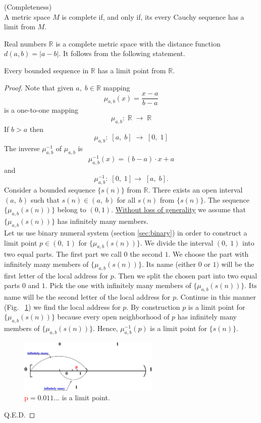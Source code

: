 \documentclass[color=black,11pt]{elegantpaper}
\begin{document}
\begin{definition} (Completeness)\\
A metric space $M$ is complete if, and only if, its every Cauchy sequence has a limit from $M.$
\end{definition}
Real numbers $\mathbb{R}$ is a complete metric space with the distance function $d(a,b)=|a-b|.$  It follows from the following statement.
\begin{theorem}
\label{th:completeness}
Every bounded sequence in  $\mathbb{R}$  has a limit point from $\mathbb{R}.$

\end{theorem} 
\begin{proof}
Note that given $a,\;b \in \mathbb{R}$ mapping
$$
\mu_{a,b}(x) = \frac{x-a}{b-a}
$$
is a one-to-one mapping 
$$
\mu_{a,b}:\;\mathbb{R} \;\to \;\mathbb{R}
$$
If $b>a$ then
$$
\mu_{a,b}:\;[a,\;b] \; \to \; [0,\;1]
$$
The inverse $\mu_{a,b}^{-1}$ of $\mu_{a,b}$ is
$$
\mu_{a,b}^{-1}(x) = (b-a) \cdot x+a 
$$
and
$$
\mu_{a,b}^{-1} :\;  [0,\;1] \to \;[a,\;b].
$$ 
Consider a bounded sequence $\{s(n)\}$ from $\mathbb{R}.$ There exists an open interval $(a,\;b)$ such that $ s(n) \in (a,\;b)$ for all $s(n)$ from $\{s(n)\}.$ The sequence $\{\mu_{a,b} (s(n)) \}$ belong to $(0,1).$ \href{https://en.wikipedia.org/wiki/Without_loss_of_generality}{Without loss of generality} we assume that $\{\mu_{a,b} (s(n)) \}$ has infinitely many members.\\
Let us use binary numeral system (section \ref{sec:binary}) in order to construct a limit point $p\in (0,\;1)$ for $\{\mu_{a,b} (s(n)) \}.$ We divide the interval $(0,\;1)$ into two equal parts. The first part we call $0$ the second $1.$ We choose the part with infinitely many members of  $\{\mu_{a,b} (s(n)) \}.$ Its name (either $0$ or $1)$ will be the first letter of the local address for $p.$ Then we split the chosen part into two equal parts $0$ and $1.$ Pick the one with infinitely many members of $\{\mu_{a,b} (s(n)) \}.$ Its name will be the second letter of the local address for $p.$   Continue in this manner (Fig. ~\ref{fig:completeness}) we find the local address for $p.$ By construction $p$ is a limit point for $\{\mu_{a,b} (s(n)) \}$  because every open neighborhood of $p$ has infinitely many members of $\{\mu_{a,b} (s(n)) \}.$ Hence, $\mu_{a,b}^{-1}(p)$ is a limit point for $\{s(n)\}.$
 
\begin{figure}[htbp]
  \centering
  \includegraphics[width=0.6\textwidth]{xfig_stuff/completeness.eps}
  \caption{\textcolor{red}{p}$=0.011\dots$ is a limit point.}
  \label{fig:completeness}
\end{figure}
\vspace{0.1cm}
Q.E.D.
\vspace{0.1cm}
\end{proof}
\end{document}
